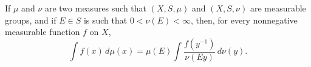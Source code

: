 If $\mu$ and $\nu$ are two measures such that $(X, S, \mu)$ and $(X, S, \nu)$ are measurable groups, and if $E \in S$ is such that $0 < \nu(E) < \infty$, then, for every nonnegative measurable function $f$ on $X$,
$$
\int f(x)\, d\mu(x) = \mu(E) \int \frac{f(y^{-1})}{\nu(Ey)}\, d\nu(y).
$$
